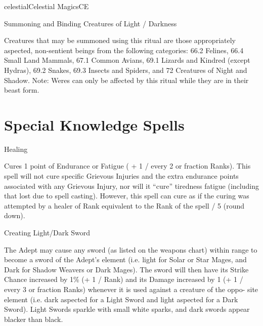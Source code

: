 \begin{College}[1.3]{celestial}{Celestial Magics}{CE}
\begin{ritual}[Q-2]{Summoning and Binding Creatures of Light / Darkness}
\begin{effects}
Creatures that may be summoned using this ritual are those
appropriately aspected, non-sentient beings from the following
categories: 66.2 Felines, 66.4 Small Land Mammals, 67.1 Common Avians,
69.1 Lizards and Kindred (except Hydras), 69.2 Snakes, 69.3 Insects
and Spiders, and 72 Creatures of Night and Shadow.  Note: Weres can
only be affected by this ritual while they are in their beast form.
\end{effects}
\end{ritual}


\section{Special Knowledge Spells}

\begin{spell}[S-1]{Healing }

\begin{effects}
Cures 1 point of Endurance or Fatigue ( + 1 / every 2 or fraction
Ranks).  This spell will not cure specific Grievous Injuries and the
extra endurance points associated with any Grievous Injury, nor will
it “cure” tiredness fatigue (including that lost due to spell
casting).  However, this spell can cure as if the curing was attempted
by a healer of Rank equivalent to the Rank of the spell / 5 (round
down).
\end{effects}
\end{spell}

\begin{spell}[S-2]{Creating Light/Dark Sword}
\begin{effects}
The Adept may cause any sword (as listed on the weapons chart) within
range to become a sword of the Adept’s element (i.e. light for Solar
or Star Mages, and Dark for Shadow Weavers or Dark Mages).  The sword
will then have its Strike Chance increased by 1\% (+ 1 / Rank) and its
Damage increased by 1 (+ 1 / every 3 or fraction Ranks) whenever it is
used against a creature of the oppo- site element (i.e. dark aspected
for a Light Sword and light aspected for a Dark Sword).  Light Swords
sparkle with small white sparks, and dark swords appear blacker than
black.
\end{effects}
\end{spell}


\end{College}
